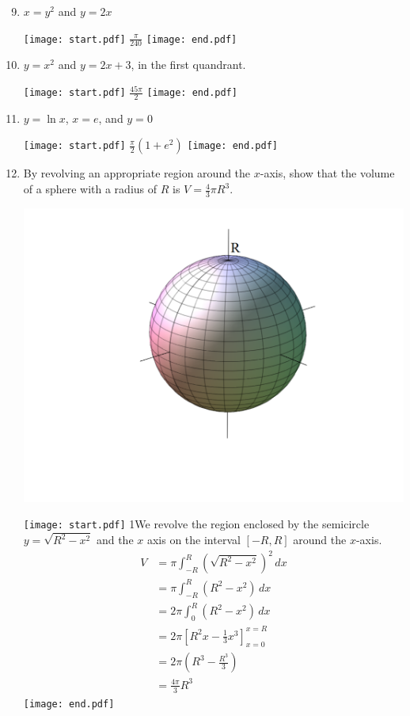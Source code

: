 \documentclass[12pt]{article}
\begin{document}

\begin{enumerate}
\setcounter{enumi}{8}

\item $x=y^2$ and $y=2x$

\texttt{[image: start.pdf]}
{{$\frac{\pi}{240}$}}
\texttt{[image: end.pdf]}


\item $y=x^2$ and $y=2x+3$, in the first quandrant.

\texttt{[image: start.pdf]}
{{$\frac{45\pi}{2}$}}
\texttt{[image: end.pdf]}


\item $y=\ln{x}$, $x=e$, and $y=0$

\texttt{[image: start.pdf]}
{{$\frac{\pi}{2}\left(1+e^2\right)$}}
\texttt{[image: end.pdf]}


\newpage

\item By revolving an appropriate region around the $x$-axis, show that the volume of a sphere with a radius of $R$ is $V=\frac{4}{3}\pi R^3$.

\begin{center}
\includegraphics[scale=0.27]{sphere.pdf}
\end{center}

\texttt{[image: start.pdf]}
{{{1\linewidth}{We revolve the region enclosed by the semicircle $y=\sqrt{R^2-x^2}$ and the $x$ axis on the interval $[-R,R]$ around the $x$-axis.
\begin{align*}
V &= \pi \int_{-R}^R (\sqrt{R^2-x^2})^2 \,dx\\
&= \pi \int_{-R}^R (R^2-x^2) \,dx\\
&= 2\pi \int_{0}^R (R^2-x^2) \,dx\\
&=2\pi\left[R^2x-\frac{1}{3}x^3\right]_{x=0}^{x=R}\\
&=2\pi\left(R^3-\frac{R^3}{3}\right)\\
&=\frac{4\pi}{3}R^3
\end{align*}
}}}
\texttt{[image: end.pdf]}



\end{enumerate}
\end{document}
